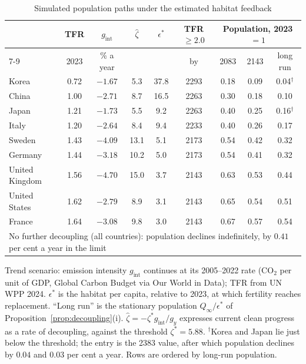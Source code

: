 \documentclass[11pt]{article}
\begin{document}
\begin{table}[h!]\centering
\begin{threeparttable}
\caption{Simulated population paths under the estimated habitat feedback}
\label{tab:proj}
\footnotesize
\setlength{\tabcolsep}{4pt}
\begin{tabular}{lcccccccc}
\toprule
 & TFR & $g_{\text{int}}$ & $\hat\zeta$ & $\epsilon^\ast$ & TFR $\ge2.0$ & \multicolumn{3}{c}{Population, 2023 $=1$}\\
\cmidrule(lr){7-9}
 & 2023 & \% a year & & & by & 2083 & 2143 & long run\\
\midrule
Korea          & 0.72 & $-1.67$ & 5.3  & 37.8 & 2293 & 0.18 & 0.09 & 0.04$^\dagger$\\
China          & 1.00 & $-2.71$ & 8.7  & 16.5 & 2263 & 0.30 & 0.18 & 0.10\\
Japan          & 1.21 & $-1.73$ & 5.5  & 9.2  & 2263 & 0.40 & 0.25 & 0.16$^\dagger$\\
Italy          & 1.20 & $-2.64$ & 8.4  & 9.4  & 2233 & 0.40 & 0.26 & 0.17\\
Sweden         & 1.43 & $-4.09$ & 13.1 & 5.1  & 2173 & 0.54 & 0.42 & 0.32\\
Germany        & 1.44 & $-3.18$ & 10.2 & 5.0  & 2173 & 0.54 & 0.41 & 0.32\\
United Kingdom & 1.56 & $-4.70$ & 15.0 & 3.7  & 2143 & 0.63 & 0.53 & 0.44\\
United States  & 1.62 & $-2.79$ & 8.9  & 3.1  & 2143 & 0.65 & 0.54 & 0.51\\
France         & 1.64 & $-3.08$ & 9.8  & 3.0  & 2143 & 0.67 & 0.57 & 0.54\\
\midrule
\multicolumn{9}{l}{No further decoupling (all countries): population declines indefinitely, by $0.41$ per cent a year in the limit}\\
\bottomrule
\end{tabular}
\begin{tablenotes}\footnotesize
\item Trend scenario: emission intensity $g_{\text{int}}$ continues at its 2005--2022 rate (CO$_2$ per unit
of GDP, Global Carbon Budget via Our World in Data); TFR from UN WPP 2024. $\epsilon^\ast$ is the habitat
per capita, relative to 2023, at which fertility reaches replacement. ``Long run'' is the stationary
population $Q_\infty/\epsilon^\ast$ of Proposition~\ref{prop:decoupling}(i). $\hat\zeta=-\zeta^\ast g_{\text{int}}/g_y$ expresses current clean progress as a
rate of decoupling, against the threshold $\zeta^\ast=5.88$. $^\dagger$Korea and Japan lie
just below the threshold; the entry is the 2383 value, after which population declines by
$0.04$ and $0.03$ per cent a year. Rows are ordered by long-run population.
\end{tablenotes}
\end{threeparttable}
\end{table}
\end{document}
